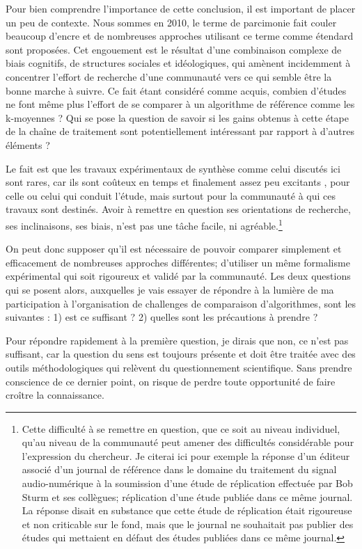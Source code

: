 Pour bien comprendre l'importance de cette conclusion, il est important de placer un peu de contexte. Nous sommes en 2010, le terme de parcimonie fait couler beaucoup d'encre et de nombreuses approches utilisant ce terme comme étendard sont proposées. Cet engouement est le résultat d'une combinaison complexe de biais cognitifs, de structures sociales et idéologiques, qui amènent incidemment à concentrer l'effort de recherche d'une communauté vers ce qui semble être la bonne marche à suivre. Ce fait étant considéré comme acquis, combien d'études ne font même plus l'effort de se comparer à un algorithme de référence comme les k-moyennes ? Qui se pose la question de savoir si les gains obtenus à cette étape de la chaîne de traitement sont potentiellement intéressant par rapport à d'autres éléments ?

Le fait est que les travaux expérimentaux de synthèse comme celui discutés ici sont rares, car ils sont coûteux en temps et finalement assez peu \og excitants \fg, pour celle ou celui qui conduit l'étude, mais surtout pour la communauté à qui ces travaux sont destinés. Avoir à remettre en question ses orientations de recherche, ses inclinaisons, ses biais, n'est pas une tâche facile, ni agréable.\footnote{Cette difficulté à se remettre en question, que ce soit au niveau individuel, qu'au niveau de la communauté peut amener des difficultés considérable pour l'expression du chercheur. Je citerai ici pour exemple la réponse d'un éditeur associé d'un journal de référence dans le domaine du traitement du signal audio-numérique à la soumission d'une étude de réplication effectuée par Bob Sturm et ses collègues; réplication d'une étude publiée dans ce même journal. La réponse disait en substance que cette étude de réplication était rigoureuse et non criticable sur le fond, mais que le journal ne souhaitait pas publier des études qui mettaient en défaut des études publiées dans ce même journal.}

On peut donc supposer qu'il est nécessaire de pouvoir comparer simplement et efficacement de nombreuses approches différentes; d'utiliser un même formalisme expérimental qui soit rigoureux et validé par la communauté. Les deux questions qui se posent alors, auxquelles je vais essayer de répondre à la lumière de ma participation à l'organisation de challenges de comparaison d'algorithmes, sont les suivantes : 1) est ce suffisant ? 2) quelles sont les précautions à prendre ?

Pour répondre rapidement à la première question, je dirais que non, ce n'est pas suffisant, car la question du sens est toujours présente et doit être traitée avec des outils méthodologiques qui relèvent du questionnement scientifique. Sans prendre conscience de ce dernier point, on risque de perdre toute opportunité de faire croître la connaissance.


